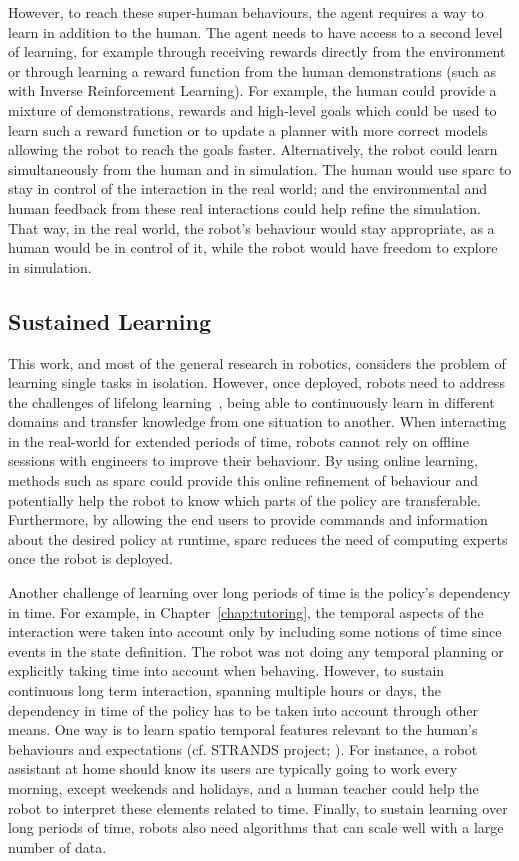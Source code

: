However, to reach these super-human behaviours, the agent requires a way to learn in addition to the human. The agent needs to have access to a second level of learning, for example through receiving rewards directly from the environment or through learning a reward function from the human demonstrations (such as with Inverse Reinforcement Learning). For example, the human could provide a mixture of demonstrations, rewards and high-level goals which could be used to learn such a reward function or to update a planner with more correct models allowing the robot to reach the goals faster. Alternatively, the robot could learn simultaneously from the human and in simulation. The human would use \gls{sparc} to stay in control of the interaction in the real world; and the environmental and human feedback from these real interactions could help refine the simulation. That way, in the real world, the robot's behaviour would stay appropriate, as a human would be in control of it, while the robot would have freedom to explore in simulation.

\subsection{Sustained Learning}

This work, and most of the general research in robotics, considers the problem of learning single tasks in isolation. However, once deployed, robots need to address the challenges of lifelong learning~\citep{thrun1995lifelong}, being able to continuously learn in different domains and transfer knowledge from one situation to another. When interacting in the real-world for extended periods of time, robots cannot rely on offline sessions with engineers to improve their behaviour. By using online learning, methods such as \gls{sparc} could provide this online refinement of behaviour and potentially help the robot to know which parts of the policy are transferable. Furthermore, by allowing the end users to provide commands and information about the desired policy at runtime, \gls{sparc} reduces the need of computing experts once the robot is deployed. 

Another challenge of learning over long periods of time is the policy's dependency in time. For example, in Chapter~\ref{chap:tutoring}, the temporal aspects of the interaction were taken into account only by including some notions of time since events in the state definition. The robot was not doing any temporal planning or explicitly taking time into account when behaving. However, to sustain continuous long term interaction, spanning multiple hours or days, the dependency in time of the policy has to be taken into account through other means. One way is to learn spatio temporal features relevant to the human's behaviours and expectations (cf. STRANDS project; \citealt{hawes2017strands}). For instance, a robot assistant at home should know its users are typically going to work every morning, except weekends and holidays, and a human teacher could help the robot to interpret these elements related to time. Finally, to sustain learning over long periods of time, robots also need algorithms that can scale well with a large number of data. 

